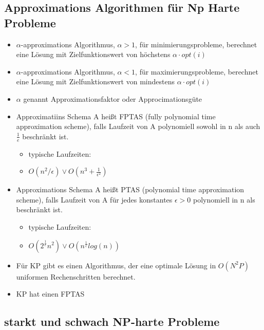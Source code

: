 \documentclass[a4paper, 10pt]{article}
\theoremstyle{definition}
\begin{document}
\subsection{Approximations Algorithmen für Np Harte Probleme}
\begin{itemize}
    \item $\alpha$-approximations Algorithmus, $\alpha>1$, für minimierungsprobleme, berechnet eine Lösung mit Zielfunktionswert von höchstens $\alpha\cdot opt(i)$
    \item $\alpha$-approximations Algorithmus, $\alpha<1$, für maximierungsprobleme, berechnet eine Lösung mit Zielfunktionswert von mindestens $\alpha\cdot opt(i)$
    \item $\alpha$ genannt Approximationsfaktor oder Approcimationsgüte
    \item Approximatiins Schema A heißt FPTAS (fully polynomial time approximation scheme), falls Laufzeit von A polynomiell sowohl in n als auch $\frac{1}{e}$ beschränkt ist.\begin{itemize}
        \item typische Laufzeiten:
        \item $O(n^2/\epsilon)\lor O(n^3+\frac{1}{\epsilon^2})$
    \end{itemize}
    \item Approximations Schema A heißt PTAS (polynomial time approximation scheme), falls Laufzeit von A für jedes konstantes $\epsilon>0$ polynomiell in n als beschränkt ist.\begin{itemize}
        \item typische Laufzeiten:
        \item $O(2^{\frac{1}{\epsilon}}n^2)\lor O(n^{\frac{1}{\epsilon}}log(n))$
    \end{itemize}
    \item Für KP gibt es einen Algorithmus, der eine optimale Lösung in $O(N^2P)$ uniformen Rechenschritten berechnet.
    \item KP hat einen FPTAS
\end{itemize}
\subsection{starkt und schwach NP-harte Probleme}
\end{document}
